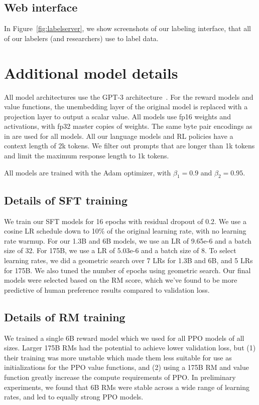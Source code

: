 \documentclass{article}
\begin{document}
\subsection{Web interface}
In Figure~\ref{fig:labelserver}, we show screenshots of our labeling interface, that all of our labelers (and researchers) use to label data. 


\newpage
\section{Additional model details}
\label{apdx:model-details}

All model architectures use the GPT-3 architecture~\citep{brown2020language}. For the reward models and value functions, the unembedding layer of the original model is replaced with a projection layer to output a scalar value. All models use fp16 weights and activations, with fp32 master copies of weights. The same byte pair encodings as in \citet{brown2020language} are used for all models. All our language models and RL policies have a context length of 2k tokens. We filter out prompts that are longer than 1k tokens and limit the maximum response length to 1k tokens.

All models are trained with the Adam optimizer, with $\beta_1=0.9$ and $\beta_2=0.95$.


\subsection{Details of SFT training}
We train our SFT models for 16 epochs with residual dropout of 0.2. We use a cosine LR schedule down to 10\% of the original learning rate, with no learning rate warmup. For our 1.3B and 6B models, we use an LR of 9.65e-6 and a batch size of 32. For 175B, we use a LR of 5.03e-6 and a batch size of 8. To select learning rates, we did a geometric search over 7 LRs for 1.3B and 6B, and 5 LRs for 175B. We also tuned the number of epochs using geometric search. Our final models were selected based on the RM score, which we've found to be more predictive of human preference results compared to validation loss.




\subsection{Details of RM training}
\label{apdx:rm-training}

We trained a single 6B reward model which we used for all PPO models of all sizes. Larger 175B RMs had the potential to achieve lower validation loss, but (1) their training was more unstable which made them less suitable for use as initializations for the PPO value functions, and (2) using a 175B RM and value function greatly increase the compute requirements of PPO. In preliminary experiments, we found that 6B RMs were stable across a wide range of learning rates, and led to equally strong PPO models.
\end{document}
